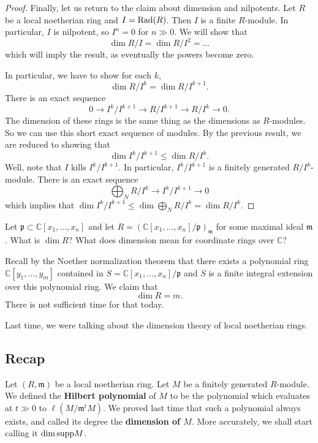 \begin{proof}
Finally, let us return to the claim about dimension and nilpotents. Let $R$ be
a local noetherian ring and $I = \mathrm{Rad} (R)$. Then $I$ is a finite $R$-module. In
particular, $I$ is nilpotent, so $I^n  = 0$ for $n \gg 0$. We will show that
\[ \dim R/I = \dim R/I^2 = \dots \]
which will imply the result, as eventually the powers become zero. 

In particular, we have to show for each $k$, 
\[ \dim R/I^k  = \dim R/I^{k+1}.  \]
There is an exact sequence
\[ 0 \to I^k/I^{k+1} \to R/I^{k+1} \to R/I^k \to 0.  \]
The dimension of these rings is the same thing as the dimensions as
$R$-modules. So we can use this short exact sequence of modules. By the
previous result, we are reduced to showing that
\[ \dim I^k/I^{k+1} \leq \dim R/I^k.  \]
Well, note that $I$ kills $I^k/I^{k+1}$. In particular, $I^k/I^{k+1}$ is a finitely generated
$R/I^k$-module. There is an exact sequence
\[ \bigoplus_N R/I^k \to I^k/I^{k+1} \to 0  \]
which implies that $\dim I^k/I^{k+1} \leq \dim \bigoplus_N R/I^k = \dim R/I^k$.
\end{proof} 

\begin{example} 
Let $\mathfrak{p} \subset \mathbb{C}[x_1, \dots, x_n]$ and let $R =
(\mathbb{C}[x_1,\dots, x_n]/\mathfrak{p})_{\mathfrak{m}}$ for some maximal
ideal $\mathfrak{m}$. What is $\dim R$? 
What does dimension mean for coordinate rings over $\mathbb{C}$?

Recall by the Noether normalization theorem that there exists a polynomial ring
$\mathbb{C}[y_1, \dots, y_m]$ contained in $S=\mathbb{C}[x_1,\dots,
x_n]/\mathfrak{p}$ and $S$ is a finite integral extension over this polynomial ring. 
We claim that 
\[ \dim R = m.  \]
There is not sufficient time for that today. 
\end{example} 



Last time, we were talking about the dimension theory of local noetherian rings.

\subsection{Recap}

Let $(R, \mathfrak{m})$ be a local noetherian ring. Let $M$ be a finitely generated
$R$-module. 	We defined the \textbf{Hilbert polynomial} of $M$ to be the
polynomial which evaluates at $t \gg 0$ to $\ell(M/\mathfrak{m}^tM)$. We proved
last time that such a polynomial always exists, and called its degree the
\textbf{dimension of $M$}. More accurately, we shall start calling it $\dim
\mathrm{supp} M$. 

